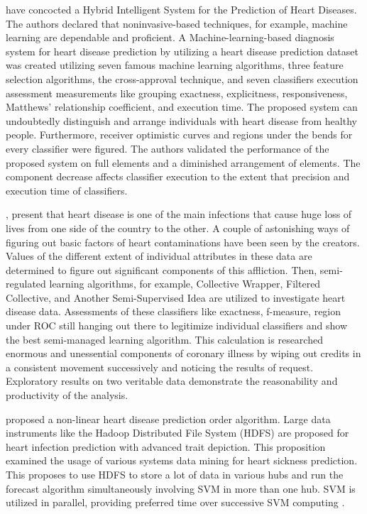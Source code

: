 {\citealp{haq2018hybrid} have concocted a Hybrid Intelligent System for the Prediction of Heart Diseases. The authors declared that noninvasive-based techniques, for example, machine learning are dependable and proficient. A Machine-learning-based diagnosis system for heart disease prediction by utilizing a heart disease prediction dataset was created utilizing seven famous machine learning algorithms, three feature selection algorithms, the cross-approval technique, and seven classifiers execution assessment measurements like grouping exactness, explicitness, responsiveness, Matthews' relationship coefficient, and execution time. The proposed system can undoubtedly distinguish and arrange individuals with heart disease from healthy people. Furthermore, receiver optimistic curves and regions under the bends for every classifier were figured. The authors validated the performance of the proposed system on full elements and a diminished arrangement of elements. The component decrease affects classifier execution to the extent that precision and execution time of classifiers.

\citealp{satu2018exploring}, present that heart disease is one of the main infections that cause huge loss of lives from one side of the country to the other. A couple of astonishing ways of figuring out basic factors of heart contaminations have been seen by the creators. Values of the different extent of individual attributes in these data are determined to figure out significant components of this affliction. Then, semi-regulated learning algorithms, for example, Collective Wrapper, Filtered Collective, and Another Semi-Supervised Idea are utilized to investigate heart disease data. Assessments of these classifiers like exactness, f-measure, region under ROC still hanging out there to legitimize individual classifiers and show the best semi-managed learning algorithm. This calculation is researched enormous and unessential components of coronary illness by wiping out credits in a consistent movement successively and noticing the results of request. Exploratory results on two veritable data demonstrate the reasonability and productivity of the analysis.

 proposed a non-linear heart disease prediction order algorithm. Large data instruments like the Hadoop Distributed File System (HDFS) are proposed for heart infection prediction with advanced trait depiction. This proposition examined the usage of various systems data mining for heart sickness prediction. This proposes to use HDFS to store a lot of data in various hubs and run the forecast algorithm simultaneously involving SVM in more than one hub. SVM is utilized in parallel, providing preferred time over successive SVM computing \citep{sharmila2015survey}.
}



